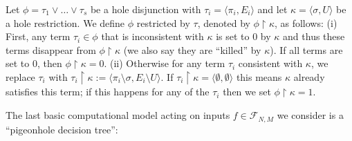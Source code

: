 \begin{definition}
    \label{def-restricting-a-dnf}
    
Let $\phi = \tau_1 \lor \ldots \lor \tau_s$ be a hole disjunction with $\tau_i = \langle \pi_i, E_i\rangle$ and let $\kappa = \langle \sigma,U\rangle$ be a hole restriction.
We define $\phi$ restricted by $\tau$, denoted by $\phi \upharpoonright\kappa$, as follows:
(i) First, any term $\tau_i \in \phi$ that is inconsistent with $\kappa$ is set to 0 by $\kappa$ and thus these terms disappear from $\phi \upharpoonright \kappa$ (we also say they are ``killed'' by $\kappa$). If all terms are set to 0, then $\phi\upharpoonright\kappa  =0$. 
(ii) Otherwise for any term $\tau_i$ consistent with $\kappa$, we replace $\tau_i$ with $\tau_i \upharpoonright \kappa := \langle \pi_i \setminus \sigma, E_i \setminus U\rangle$. If $\tau_i \upharpoonright \kappa = \langle \emptyset, \emptyset \rangle$ this means $\kappa$ already satisfies this term; if this happens for any of the $\tau_i$ then we set $\phi \upharpoonright \kappa=1$. 
\end{definition}

The last basic computational model acting on inputs $f\in \mathcal{F}_{N,M}$ we consider is a ``pigeonhole decision tree'':

